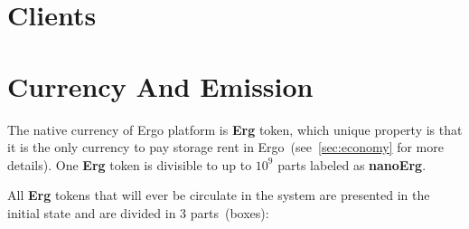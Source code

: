 \documentclass[]{article}
\newcommand{\Ergo}{Ergo}
\newcommand{\Erg}{\textbf{Erg}}
\newcommand{\nanoErg}{\textbf{nanoErg}}
\begin{document}
    \section{Clients}
    \label{sec:clients}



    \section{Currency And Emission}
    \label{sec:currency}


    The native currency of \Ergo{} platform is \Erg{} token, which unique property is
    that it is the only currency to pay storage rent in \Ergo{}~(see~\ref{sec:economy} for more details).
    One \Erg{} token is divisible to up to $10^9$ parts labeled as \nanoErg{}.

    All \Erg{} tokens that will ever be circulate in the system are presented in the
    initial state and are divided in 3 parts~(boxes):
\end{document}

